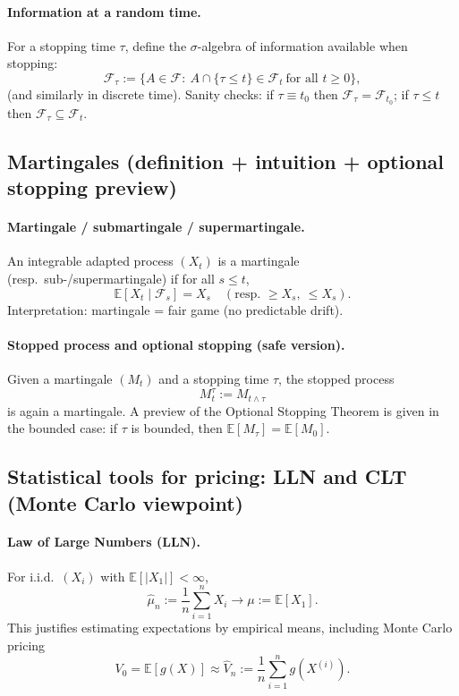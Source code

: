 \documentclass[11pt]{article}
\newcommand{\E}{\mathbb{E}}
\newcommand{\1}{\mathbf{1}}
\theoremstyle{plain}
\theoremstyle{definition}
\theoremstyle{remark}
\begin{document}
\paragraph{Information at a random time.}
For a stopping time $\tau$, define the $\sigma$-algebra of information available when stopping:
\[
\mathcal F_\tau
:=\{A\in\mathcal F:\ A\cap\{\tau\le t\}\in\mathcal F_t\ \text{for all }t\ge 0\},
\]
(and similarly in discrete time).
Sanity checks: if $\tau\equiv t_0$ then $\mathcal F_\tau=\mathcal F_{t_0}$; if $\tau\le t$ then $\mathcal F_\tau\subseteq\mathcal F_t$.

\subsection{Martingales (definition + intuition + optional stopping preview)}

\paragraph{Martingale / submartingale / supermartingale.}
An integrable adapted process $(X_t)$ is a martingale (resp.\ sub-/supermartingale) if for all $s\le t$,
\[
\E[X_t\mid\mathcal F_s]=X_s
\quad(\text{resp. }\ge X_s,\ \le X_s).
\]
Interpretation: martingale = fair game (no predictable drift).

\paragraph{Stopped process and optional stopping (safe version).}
Given a martingale $(M_t)$ and a stopping time $\tau$, the stopped process
\[
M_t^\tau:=M_{t\wedge \tau}
\]
is again a martingale.
A preview of the Optional Stopping Theorem is given in the bounded case:
if $\tau$ is bounded, then $\E[M_\tau]=\E[M_0]$.

\subsection{Statistical tools for pricing: LLN and CLT (Monte Carlo viewpoint)}

\paragraph{Law of Large Numbers (LLN).}
For i.i.d.\ $(X_i)$ with $\E[|X_1|]<\infty$,
\[
\widehat\mu_n:=\frac1n\sum_{i=1}^n X_i \to \mu:=\E[X_1].
\]
This justifies estimating expectations by empirical means, including Monte Carlo pricing
\[
V_0=\E[g(X)]\approx \widehat V_n:=\frac1n\sum_{i=1}^n g(X^{(i)}).
\]
\end{document}
